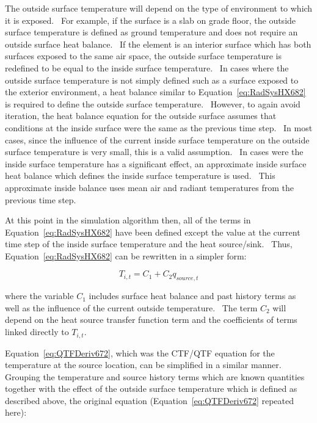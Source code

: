 {The outside surface temperature will depend on the type of environment to which it is exposed.~ For example, if the surface is a slab on grade floor, the outside surface temperature is defined as ground temperature and does not require an outside surface heat balance.~ If the element is an interior surface which has both surfaces exposed to the same air space, the outside surface temperature is redefined to be equal to the inside surface temperature.~ In cases where the outside surface temperature is not simply defined such as a surface exposed to the exterior environment, a heat balance similar to Equation~\ref{eq:RadSysHX682} is required to define the outside surface temperature.~ However, to again avoid iteration, the heat balance equation for the outside surface assumes that conditions at the inside surface were the same as the previous time step.~ In most cases, since the influence of the current inside surface temperature on the outside surface temperature is very small, this is a valid assumption.~ In cases were the inside surface temperature has a significant effect, an approximate inside surface heat balance which defines the inside surface temperature is used.~ This approximate inside balance uses mean air and radiant temperatures from the previous time step.

At this point in the simulation algorithm then, all of the terms in Equation~\ref{eq:RadSysHX682} have been defined except the value at the current time step of the inside surface temperature and the heat source/sink.~ Thus, Equation~\ref{eq:RadSysHX682} can be rewritten in a simpler form:

\begin{equation}
{T_{i,t}} = {C_1} + {C_2}{q_{source,t}}
\label{eq:RadSysHX683}
\end{equation}

where the variable \(C_1\) includes surface heat balance and past history terms as well as the influence of the current outside temperature.~ The term \(C_2\) will depend on the heat source transfer function term and the coefficients of terms linked directly to \(T_{i,t}\).

Equation~\ref{eq:QTFDeriv672}, which was the CTF/QTF equation for the temperature at the source location, can be simplified in a similar manner.~ Grouping the temperature and source history terms which are known quantities together with the effect of the outside surface temperature which is defined as described above, the original equation (Equation~\ref{eq:QTFDeriv672} repeated here):

}
